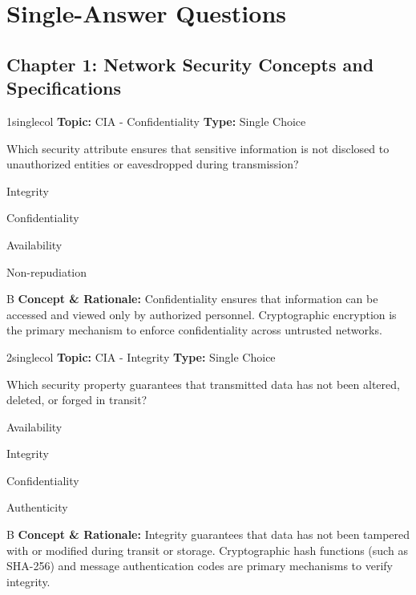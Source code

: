 \documentclass[10pt,a4paper]{book}
\begin{document}
\chapter{Single-Answer Questions}
\section{Chapter 1: Network Security Concepts and Specifications}

\begin{qcard}{1}{singlecol}
\textcolor{darkslate!75}{\small\textbf{Topic:} CIA - Confidentiality \hfill \textbf{Type:} Single Choice}\vspace{0.4em}\par
Which security attribute ensures that sensitive information is not disclosed to unauthorized entities or eavesdropped during transmission?
\begin{qoptions}
\item Integrity
\item Confidentiality
\item Availability
\item Non-repudiation
\end{qoptions}
\end{qcard}
\nopagebreak
\begin{explainbox}{B}
\textbf{Concept \& Rationale:} Confidentiality ensures that information can be accessed and viewed only by authorized personnel. Cryptographic encryption is the primary mechanism to enforce confidentiality across untrusted networks.
\end{explainbox}

\begin{qcard}{2}{singlecol}
\textcolor{darkslate!75}{\small\textbf{Topic:} CIA - Integrity \hfill \textbf{Type:} Single Choice}\vspace{0.4em}\par
Which security property guarantees that transmitted data has not been altered, deleted, or forged in transit?
\begin{qoptions}
\item Availability
\item Integrity
\item Confidentiality
\item Authenticity
\end{qoptions}
\end{qcard}
\nopagebreak
\begin{explainbox}{B}
\textbf{Concept \& Rationale:} Integrity guarantees that data has not been tampered with or modified during transit or storage. Cryptographic hash functions (such as SHA-256) and message authentication codes are primary mechanisms to verify integrity.
\end{explainbox}
\end{document}
